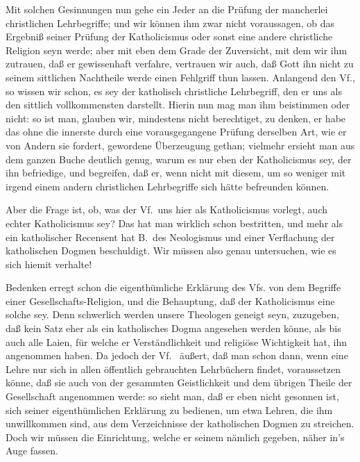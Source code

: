 Mit solchen Gesinnungen nun gehe ein Jeder an die Prüfung der mancherlei christlichen Lehrbegriffe; und wir können ihm zwar nicht voraussagen, ob das Ergebniß seiner Prüfung der Katholicismus oder sonst eine andere christliche Religion seyn werde; aber mit eben dem Grade der Zuversicht, mit dem wir ihm zutrauen, daß er gewissenhaft verfahre, vertrauen wir auch, daß Gott ihn nicht zu seinem sittlichen Nachtheile werde einen Fehlgriff thun lassen. Anlangend den Vf., so wissen wir schon, es sey der katholisch christliche Lehrbegriff, den er uns als den sittlich vollkommensten darstellt. Hierin nun mag man ihm beistimmen oder nicht: so ist man, glauben wir, mindestens nicht berechtiget, zu denken, er habe das ohne die innerste durch eine vorausgegangene Prüfung derselben Art, wie er von Andern sie fordert, gewordene Überzeugung gethan; vielmehr ersieht man aus dem ganzen Buche deutlich genug, warum es nur eben der Katholicismus sey, der ihn befriedige, und begreifen, daß er, wenn nicht mit diesem, um so weniger mit irgend einem andern christlichen Lehrbegriffe sich hätte befreunden können. \par
Aber die Frage ist, ob, was der Vf.\ uns hier als Katholicismus vorlegt, auch echter Katholicismus  sey? Das hat man wirklich schon bestritten, und mehr als ein katholischer Recensent hat B.\ des Neologismus und einer Verflachung der katholischen Dogmen beschuldigt. Wir müssen also genau untersuchen, wie es sich hiemit verhalte! \par
Bedenken erregt schon die eigenthümliche Erklärung des Vfs. von dem Begriffe einer Gesellschafts-Religion, und die Behauptung, daß der Katholicismus eine solche sey. Denn schwerlich werden unsere Theologen geneigt seyn, zuzugeben, daß kein Satz eher als ein katholisches Dogma angesehen werden könne, als bis auch alle Laien, für welche er Verständlichkeit und religiöse Wichtigkeit hat, ihn angenommen haben. Da jedoch der Vf.\  äußert, daß man schon dann, wenn eine Lehre nur sich in allen öffentlich gebrauchten Lehrbüchern findet, voraussetzen könne, daß sie auch von der gesammten Geistlichkeit und dem übrigen Theile der Gesellschaft angenommen werde: so sieht man, daß er eben nicht gesonnen ist, sich seiner eigenthümlichen Erklärung zu bedienen, um etwa Lehren, die ihm unwillkommen sind, aus dem Verzeichnisse der katholischen Dogmen zu streichen. Doch wir müssen die Einrichtung, welche er seinem  nämlich  gegeben, näher in's Auge fassen. \par
